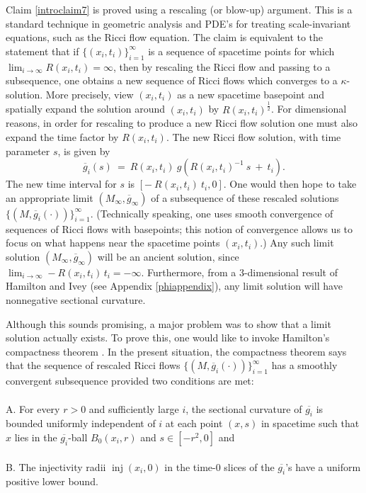 \documentclass[12pt]{amsart}
\newcommand{\inj}{\operatorname{inj}}
\numberwithin{equation}{section}
\theoremstyle{plain}
\theoremstyle{definition}
\theoremstyle{remark}
\begin{document}
Claim \ref{introclaim7} is proved using  a rescaling (or blow-up) argument.
This is a standard technique in geometric analysis and PDE's for treating
scale-invariant equations, such as the Ricci flow equation.  
The claim is equivalent to the statement
that if $\{(x_i, t_i)\}_{i=1}^\infty$ is a sequence of spacetime points
for which  $\lim_{i \rightarrow \infty} R(x_i, t_i) = \infty$, then 
by rescaling  the Ricci flow and passing to a subsequence, one obtains
a new sequence of Ricci flows which converges to a $\kappa$-solution.
More precisely, 
view $(x_i, t_i)$ as a new
spacetime basepoint and spatially expand the solution around $(x_i, t_i)$
by $R(x_i,t_i)^{\frac12}$.  For dimensional reasons,
in order for rescaling to produce a new Ricci flow solution
one must also expand the time factor by $R(x_i,t_i)$. The new 
Ricci flow solution, with time parameter $s$, is given by
\begin{equation}
\overline{g}_i(s) \: = \: R(x_i,t_i) \: 
g \left( R(x_i,t_i)^{-1}  \: s \: + \: t_i \right).
\end{equation}
The new time interval for $s$ is
$\left[ - \:  R(x_i,t_i) \: t_i,0 \right]$.
One would then hope to take an appropriate limit $(M_\infty, 
\overline{g}_\infty)$ of a subsequence of these rescaled solutions 
$\{(M,  \overline{g}_i(\cdot))\}_{i=1}^\infty$.
(Technically speaking,
one uses smooth convergence of sequences of Ricci flows with basepoints;
this notion of convergence allows us to focus on what happens near
the spacetime points $(x_i, t_i)$.)
Any such  limit solution $(M_\infty,  \overline{g}_\infty)$ will be an ancient
solution,  since
$\lim_{i \rightarrow \infty} -R(x_i,t_i)\,t_i = -\infty$.
Furthermore, from a $3$-dimensional
result of Hamilton and Ivey (see Appendix \ref{phiappendix}),
any limit solution will have nonnegative sectional
curvature.  


Although this sounds promising,
a major  problem was to show that a limit solution
actually exists.
To prove this, one would like to invoke Hamilton's compactness
theorem \cite{Hamiltonnn}.   In the present situation, the
compactness theorem says
that the sequence  of rescaled Ricci flows  
$\{(M,  \overline{g}_i(\cdot))\}_{i=1}^\infty$
has a smoothly convergent subsequence provided two conditions are met: \\ \\
\noindent
A. For every $r>0$ and sufficiently large $i$,
the sectional curvature of $\overline{g_i}$ is  bounded uniformly independent of $i$
at each point $(x,s)$ in  spacetime such that $x$ lies in the $\overline{g_i}$-ball
$B_0(x_i,r)$ and $s\in [-r^2,0]$ and \\ \\
\noindent
B.  The  injectivity radii
$\inj(x_i, 0)$ in the time-$0$ slices of the $\overline{g_i}$'s have a 
uniform positive lower bound.
\end{document}
